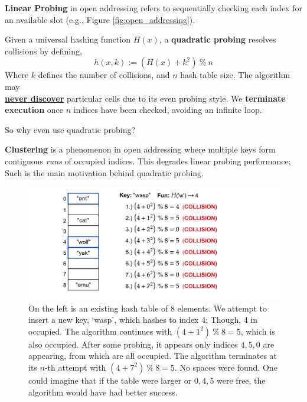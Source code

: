 \begin{Def}

   \textbf{Linear Probing} in open addressing refers to sequentially checking each index for an available slot (e.g., Figure \ref{fig:open_addressing}).
\end{Def}

\newpage

\begin{Def}

    Given a universal hashing function  $H(x)$, a \textbf{quadratic probing} resolves collisions by defining,
    \[h(x,k):= (H(x) + k^2)\ \%\ n\] 
    Where $k$ defines the number of collisions, and $n$ hash table size. The algorithm may\\
    \underline{\textbf{never discover}} particular cells due to its even probing style.
    We \textbf{terminate execution} once $n$ indices have been checked, avoiding an infinite loop.
\end{Def}

\noindent
So why even use quadratic probing?
\begin{Def}[Clustering]

    \textbf{Clustering} is a phenomenon in open addressing where multiple keys form contiguous \emph{runs} of occupied indices.
    This degrades linear probing performance; Such is the main motivation behind quadratic probing.
\end{Def}

\begin{figure}[ht!]

    \centering
    \includegraphics[width=\textwidth]{Sections/hash/quadratic_probing.png}
    \caption{On the left is an existing hash table of 8 elements. We attempt to insert a new key, `wasp', which hashes to index $4$;
    Though, 4 in occupied. The algorithm continues with $(4 + 1^2)\ \%\ 8 = 5$, which is also occupied. After some probing, it appears only indices $4, 5, 0$
    are appearing, from which are all occupied. The algorithm terminates at its $n$-th attempt with $(4+7^2)\ \%\ 8 = 5$. No spaces were found. One could imagine
    that if the table were larger or $0,4,5$ were free, the algorithm would have had better success.}
    \label{fig:quadratic_probing}
\end{figure}


